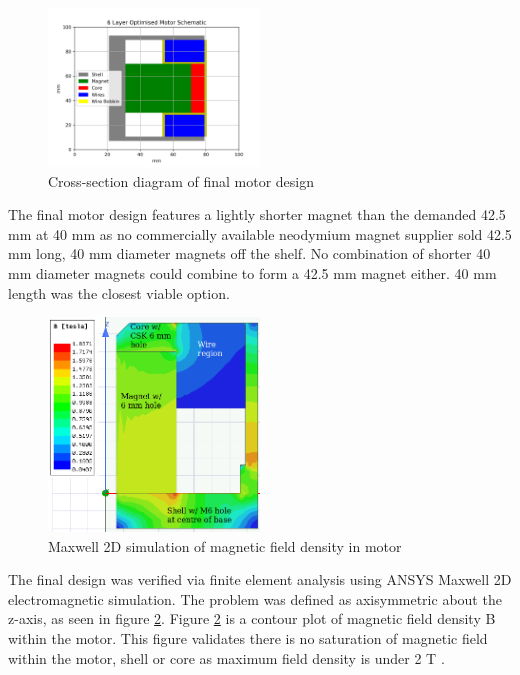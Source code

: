 \documentclass[a4paper,12pt]{article}
\begin{document}
\begin{figure}[h!]
    \centering
    \includegraphics[width=0.5\textwidth]{finalDesign_layers.png}
    \caption{Cross-section diagram of final motor design}
    \label{fg:finalmotor}
\end{figure}

The final motor design features a lightly shorter magnet than the demanded 42.5 mm at 40 mm as no commercially available neodymium magnet supplier sold 42.5 mm long, 40 mm diameter magnets off the shelf. No combination of shorter 40 mm diameter magnets could combine to form a 42.5 mm magnet either. 40 mm length was the closest viable option.

\begin{figure}[h!]
    \centering
    \includegraphics[width=0.5\textwidth]{maxwell.png}
    \caption{Maxwell 2D simulation of magnetic field density in motor}
    \label{fg:maxwellB}
\end{figure}

The final design was verified via finite element analysis using ANSYS Maxwell 2D electromagnetic simulation. The problem was defined as axisymmetric about the z-axis, as seen in figure \ref{fg:maxwellB}. Figure \ref{fg:maxwellB} is a contour plot of magnetic field density B within the motor. This figure validates there is no saturation of magnetic field within the motor, shell or core as maximum field density is under 2 T \cite{mclymanMagneticMaterialsTheir2004}.
\end{document}
